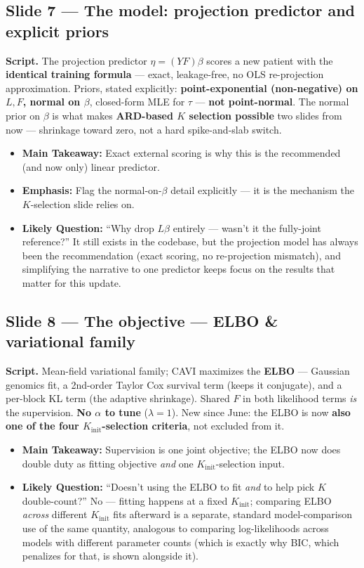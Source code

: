 \documentclass[11pt]{article}
\newcommand{\scriptlabel}{\textbf{Script. }}
\newcommand{\sectionlabel}[1]{\textbf{#1}}
\newcommand{\key}[1]{\textcolor{keyblue}{\textbf{#1}}}        %
\begin{document}
\subsection*{Slide 7 --- The model: projection predictor and explicit priors}
\scriptlabel The projection predictor $\eta = (YF)\beta$ scores a new patient with the \key{identical
training formula} --- exact, leakage-free, no OLS re-projection approximation. Priors, stated
explicitly: \key{point-exponential (non-negative) on $L,F$, normal on $\beta$}, closed-form MLE for
$\tau$ --- \key{not point-normal}. The normal prior on $\beta$ is what makes \key{ARD-based $K$
selection possible} two slides from now --- shrinkage toward zero, not a hard spike-and-slab switch.

\begin{itemize}
\item \sectionlabel{Main Takeaway:} Exact external scoring is why this is the recommended (and now
only) linear predictor.
\item \sectionlabel{Emphasis:} Flag the normal-on-$\beta$ detail explicitly --- it is the mechanism
the $K$-selection slide relies on.
\item \sectionlabel{Likely Question:} ``Why drop $L\beta$ entirely --- wasn't it the fully-joint
reference?'' It still exists in the codebase, but the projection model has always been the
recommendation (exact scoring, no re-projection mismatch), and simplifying the narrative to one
predictor keeps focus on the results that matter for this update.
\end{itemize}

\subsection*{Slide 8 --- The objective --- ELBO \& variational family}
\scriptlabel Mean-field variational family; CAVI maximizes the \key{ELBO} --- Gaussian genomics fit,
a 2nd-order Taylor Cox survival term (keeps it conjugate), and a per-block KL term (the adaptive
shrinkage). Shared $F$ in both likelihood terms \emph{is} the supervision. \key{No $\alpha$ to tune}
($\lambda=1$). New since June: the ELBO is now \key{also one of the four $K_\text{init}$-selection
criteria}, not excluded from it.

\begin{itemize}
\item \sectionlabel{Main Takeaway:} Supervision is one joint objective; the ELBO now does double duty
as fitting objective \emph{and} one $K_\text{init}$-selection input.
\item \sectionlabel{Likely Question:} ``Doesn't using the ELBO to fit \emph{and} to help pick $K$
double-count?'' No --- fitting happens at a fixed $K_\text{init}$; comparing ELBO \emph{across}
different $K_\text{init}$ fits afterward is a separate, standard model-comparison use of the same
quantity, analogous to comparing log-likelihoods across models with different parameter counts (which
is exactly why BIC, which penalizes for that, is shown alongside it).
\end{itemize}
\end{document}
